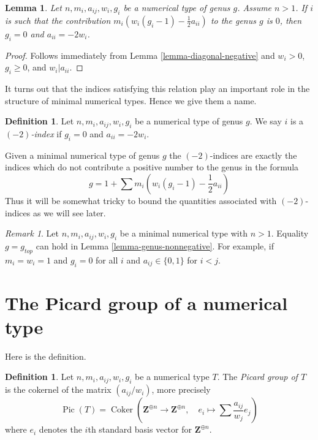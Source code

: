 \documentclass{stacks-project}
\theoremstyle{plain}
\newtheorem{lemma}[subsection]{Lemma}
\theoremstyle{definition}
\newtheorem{definition}[subsection]{Definition}
\theoremstyle{remark}
\newtheorem{remark}[subsection]{Remark}
\numberwithin{equation}{subsection}
\def\Coker{\mathop{\mathrm{Coker}}}
\def\Pic{\mathop{\mathrm{Pic}}\nolimits}
\begin{document}
\begin{lemma}
\label{lemma-minus-two}
Let $n, m_i, a_{ij}, w_i, g_i$ be a numerical type of genus $g$.
Assume $n > 1$. If $i$ is such that the contribution
$m_i(w_i(g_i - 1) - \frac{1}{2} a_{ii})$
to the genus $g$ is $0$, then $g_i = 0$ and $a_{ii} = -2w_i$.
\end{lemma}

\begin{proof}
Follows immediately from Lemma \ref{lemma-diagonal-negative} and
$w_i > 0$, $g_i \geq 0$, and $w_i | a_{ii}$.
\end{proof}

\noindent
It turns out that the indices satisfying this relation play an
important role in the structure of minimal numerical types.
Hence we give them a name.

\begin{definition}
\label{definition-type-minus-two}
Let $n, m_i, a_{ij}, w_i, g_i$ be a numerical type of genus $g$.
We say $i$ is a {\it $(-2)$-index} if $g_i = 0$ and $a_{ii} = -2w_i$.
\end{definition}

\noindent
Given a minimal numerical type of genus $g$ the $(-2)$-indices
are exactly the indices which do not contribute a positive number
to the genus in the formula
$$
g = 1 + \sum m_i(w_i(g_i - 1) - \frac{1}{2} a_{ii})
$$
Thus it will be somewhat tricky to bound the quantities associated
with $(-2)$-indices as we will see later.

\begin{remark}
\label{remark-genus-equality}
Let $n, m_i, a_{ij}, w_i, g_i$ be a minimal numerical type with $n > 1$.
Equality $g = g_{top}$ can hold in Lemma \ref{lemma-genus-nonnegative}.
For example, if $m_i = w_i = 1$ and $g_i = 0$ for all $i$ and
$a_{ij} \in \{0, 1\}$ for $i < j$.
\end{remark}


\section{The Picard group of a numerical type}
\label{section-picard-group}

\noindent
Here is the definition.

\begin{definition}
\label{definition-picard-group}
Let $n, m_i, a_{ij}, w_i, g_i$ be a numerical type $T$. The
{\it Picard group of $T$} is the cokernel of the matrix
$(a_{ij}/w_i)$, more precisely
$$
\Pic(T) =
\Coker\left(
\mathbf{Z}^{\oplus n} \to \mathbf{Z}^{\oplus n},\quad
e_i
\mapsto
\sum \frac{a_{ij}}{w_j}e_j
\right)
$$
where $e_i$ denotes the $i$th standard basis vector for $\mathbf{Z}^{\oplus n}$.
\end{definition}
\end{document}
